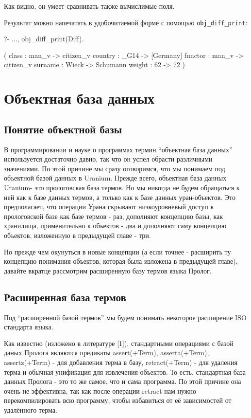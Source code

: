 \documentclass[a4paper]{book}
\def\ur{Uranium}
\begin{document}
Как видно, он умеет сравнивать также вычислимые поля.


Результат можно напечатать в удобочитаемой форме с помощью
\verb|obj_diff_print|:

\begin{example}{}{}
?- ..., obj_diff_print(Diff).

( 
  class : man_v -> citizen_v 
  country : _G14 -> [Germany] 
  functor : man_v -> citizen_v 
  surname : Wieck -> Schumann 
  weight : 62 -> 72 
) 
\end{example}


\chapter{Объектная база данных}
\label{ur_recorded_db}

\section{Понятие объектной базы}

В программировании и науке о программах термин ``объектная база
данных'' используется достаточно давно, так что он успел обрасти
различными значениями. По этой причине мы сразу оговоримся, что
мы понимаем под объектной базой данных в \ur. Прежде всего,
объектная база данных \ur - это прологовская база термов. Но
мы никогда не будем обращаться к ней как к базе данных термов, а
только как к базе данных уран-объектов. Это предполагает, что
операции Урана скрывают низкоуровневый доступ к прологовской базе
как базе термов - раз, дополняют концепцию базы, как хранилища,
применительно к объектов - два и дополняют саму концепцию
объектов, изложенную в предыдущей главе - три.

Но прежде чем окунуться в новые концепции (а если точнее -
расширить ту концепцию понимания объектов, которая была изложена
в предыдущей главе), давайте вкратце рассмотрим расширенную базу
термов языка Пролог.
 
\section{Расширенная база термов}

Под ``расширенной базой термов'' мы будем понимать некоторое
расширение ISO стандарта языка. 

Как известно (изложено в литературе [1]), стандартными операциями
с базой даных Пролога являются предикаты  assert(+Term),
asserta(+Term), assertz(+Term) - для добавления терма в базу,
retract(+Term) - для удаления терма и обычная унификация для
извлечения объектов. То есть, стандартная база данных Пролога -
это то же самое, что и сама программа. По этой причине она очень
не эффективна, так как после операции retract нам нужно
перекомпилировать всю программу, чтобы избавиться от её
зависимостей от удалённого терма.
\end{document}
